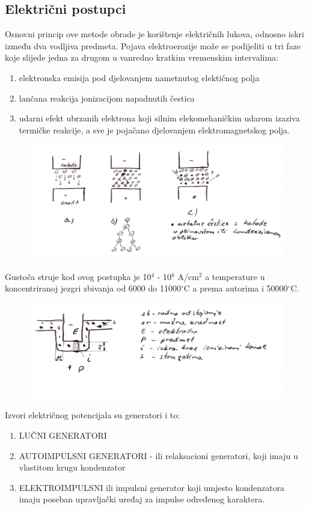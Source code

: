 \documentclass[a4paper,12pt]{article}
\numberwithin{figure}{section}
\begin{document}
\subsection{Električni postupci}
Osnovni princip ove metode obrade je korištenje električnih lukova, odnosno iskri između dva vodljiva predmeta. Pojava elektroerozije može se podijeliti u tri faze koje slijede jedna za drugom u vanredno kratkim vremenskim intervalima:
\begin{enumerate}
\item elektronska emisija pod djelovanjem nametnutog elektičnog polja
\item lančana reakcija jonizacijom napadnutih čestica
\item udarni efekt ubrzanih elektrona koji silnim elekomehaničkim udarom izaziva termičke reakcije, a sve je pojačano djelovanjem elektromagnetskog polja.
\end{enumerate}
\begin{figure}[!h]
\centering
\includegraphics[scale=0.17]{image_63-1.png}
\end{figure}
\FloatBarrier
Gustoča struje kod ovog postupka je 10$^{4}$ - 10$^{6}$ A/cm$^{2}$ a temperature u koncentriranoj jezgri zbivanja od 6000 do 11000$^{\circ}$C a prema autorima i 50000$^{\circ}$C.\par
\begin{figure}[!h]
\centering
\includegraphics[scale=0.17]{image_63-2.png}
\end{figure}
\FloatBarrier
Izvori električnog potencijala su generatori i to:
\begin{enumerate}
\item LUČNI GENERATORI
\item AUTOIMPULSNI GENERATORI - ili relaksacioni generatori, koji imaju u vlastitom krugu kondenzator
\item ELEKTROIMPULSNI ili impulsni generator koji umjesto kondenzatora imaju poseban upravljački uređaj za impulse određenog karaktera.
\end{enumerate}
\end{document}
